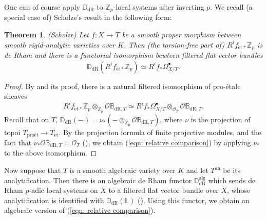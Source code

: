 \documentclass[11pt, letterpaper]{amsart}
\theoremstyle{plain}
\newtheorem{theorem}{Theorem}[section]
\theoremstyle{definition}
\newcommand{\IB}{\mathbb{B}}
\newcommand{\ID}{\mathbb{D}}
\newcommand{\IL}{\mathbb{L}}
\newcommand{\IZ}{\mathbb{Z}}
\newcommand\tensor{{\otimes}}
\newcommand{\<}{\langle}
\renewcommand{\>}{\rangle}
\newcommand{\sO}{\mathcal{O}}
\newcommand{\et}{\mathrm{{\acute{e}}t}}
\newcommand{\dR}{\mathrm{dR}}
\newcommand{\alg}{{\mathrm{alg}}}
\begin{document}
One can of course apply $\ID_\dR$ to $\IZ_p$-local systems after inverting $p$. 
We recall (a special case of) Scholze's result \cite[Thm.~8.8]{Sch13} in the following form: 
\begin{theorem}
\emph{(Scholze)}
    Let $f : X \to T$ be a smooth proper morphism between smooth rigid-analytic varieties over $K$. Then (the torsion-free part of) $R^i f_{\et *} \IZ_p$ is de Rham and there is a functorial isomorphism bewteen filtered flat vector bundles 
    \begin{equation}
    \label{eqn: relative comparison}
        \ID_\dR(R^i f_{\et *} \IZ_p) \simeq R^i f_* \Omega_{X/T}^\bullet. 
    \end{equation}
\end{theorem}
\begin{proof}
    By \cite[Thm.~8.8]{Sch13} and its proof, there is a natural filtered isomorphism of pro-\'etale sheaves 
    $$ R^i f_{\et *} \IZ_p \tensor_{\IZ_p} \sO \IB_{\dR, T} \simeq R^i f_* \Omega_{X/T}^\bullet \tensor_{\sO_T} \sO \IB_{\dR, T}. $$
    Recall that on $T$, $\ID_\dR(-) = \nu_*(- \tensor_{\IZ_p} \sO \IB_{\dR, T}) $, where $\nu$ is the projection of topoi $T_{\textrm{pro{\'et}}} \to T_\et$. By the projection formula of finite projective modules, and the fact that $\nu_* \sO \IB_{\dR, T} = \sO_{T}$ (\cite[Cor.~6.19]{Sch13}), we obtain (\ref{eqn: relative comparison}) by applying $\nu_*$ to the above isomorphism. 
\end{proof}


 
Now suppose that $T$ is a smooth algebraic variety over $K$ and let $T^{\mathrm{an}}$ be its analytification. Then there is an algebraic de Rham functor $\ID^\alg_\dR$ which sends de Rham $p$-adic local systems on $X$ to a filtered flat vector bundle over $X$, whose analytification is identified with $\ID_\dR(\IL)$ (\cite[Thm~1.1]{DLLZ}). Using this functor, we obtain an algebraic version of (\ref{eqn: relative comparison}). 
\end{document}
